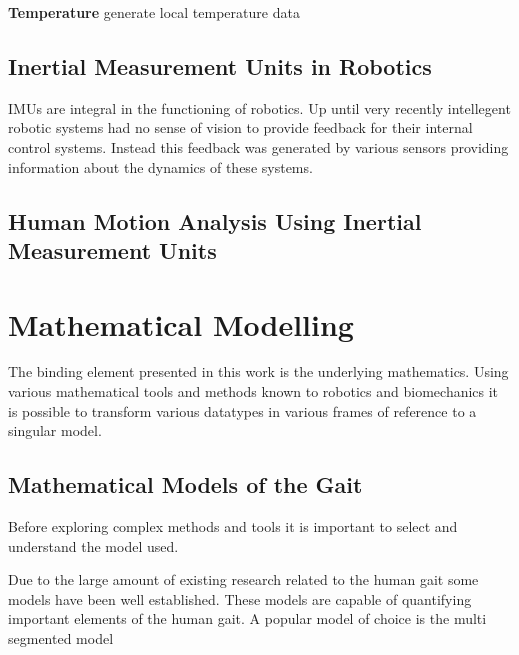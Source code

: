 \textbf{Temperature} generate local temperature data 





\subsection{Inertial Measurement Units in Robotics}
IMUs are integral in the functioning of robotics. Up until very recently intellegent robotic systems  had no sense of vision to provide feedback for their internal control systems. Instead this feedback was generated by various sensors providing information about the dynamics of these systems.










\subsection{Human Motion Analysis Using Inertial Measurement Units}
\cite{picerno201725}










\section{Mathematical Modelling}
The binding element presented in this work is the underlying mathematics. Using various mathematical tools and methods known to robotics and biomechanics it is possible to transform various datatypes in various frames of reference to a singular model.








\subsection{Mathematical Models of the Gait}
Before exploring complex methods and tools it is important to select and understand the model used.

Due to the large amount of existing research related to the human gait some models have been well established. These models are capable of quantifying important elements of the human gait. A popular model of choice is the multi segmented model 

